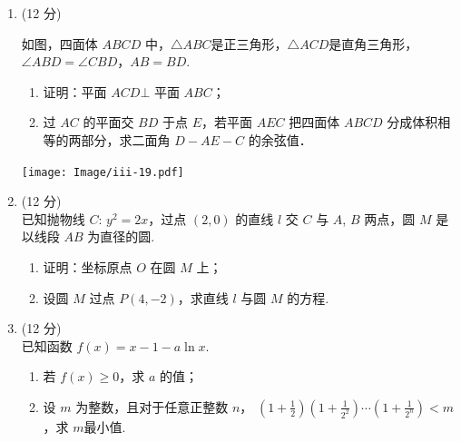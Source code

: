 \documentclass[12pt,space]{ctexart} %
\begin{document}
\begin{enumerate}[itemsep=-0.3em,topsep=0pt,resume]
  \item (12 分)\\[0.5em] 
    \begin{minipage}[h][20ex][t]{.55\textwidth}
      如图，四面体 $ABCD$ 中，$\triangle ABC$是正三角形，$\triangle ACD$是直角三角形，$\angle ABD=\angle CBD$，$AB=BD$.
      \begin{enumerate}[itemsep=-0.3em,label={(\arabic*)},topsep=0pt,labelsep=.5em,leftmargin=1.7em]
        \item 证明：平面 $ACD\bot $ 平面 $ABC$；
        \item 过 $AC$ 的平面交 $BD$ 于点 $E$，若平面 $AEC$ 把四面体 $ABCD$ 分成体积相等的两部分，求二面角 $D-AE-C$ 的余弦值．
      \end{enumerate}
    \end{minipage}
    \begin{minipage}[h][20ex][t]{.45\textwidth}
      \texttt{[image: Image/iii-19.pdf]}
    \end{minipage}\vspace{3em}

\item (12 分)\\
已知抛物线 $C\colon\, y^2=2x$，过点 $(2,0)$ 的直线 $l$ 交 $C$ 与 $A$, $B$ 两点，圆 $M$ 是以线段 $AB$ 为直径的圆.
\begin{enumerate}[itemsep=-0.3em,label={(\arabic*)},topsep=0pt,labelsep=.5em,leftmargin=1.7em]
	\item 证明：坐标原点 $O$ 在圆 $M$ 上；
	\item 设圆 $M$ 过点 $P(4,-2)$，求直线 $l$ 与圆 $M$ 的方程.
\end{enumerate}

\item (12 分)\\
已知函数 $f(x)=x-1-a\ln x$.
\begin{enumerate}[itemsep=-0.3em,label={(\arabic*)},topsep=0pt,labelsep=.5em,leftmargin=1.7em]
	\item 若 $f(x)\geqslant0$，求 $a$ 的值；
	\item 设 $m$ 为整数，且对于任意正整数 $n$， $\left(1+\tfrac{1}{2}\right)\left(1+\tfrac{1}{2^2}\right)\cdots\left(1+\tfrac{1}{2^n}\right)<m$，求 $m$最小值.
\end{enumerate}
\end{enumerate}
\end{document}
